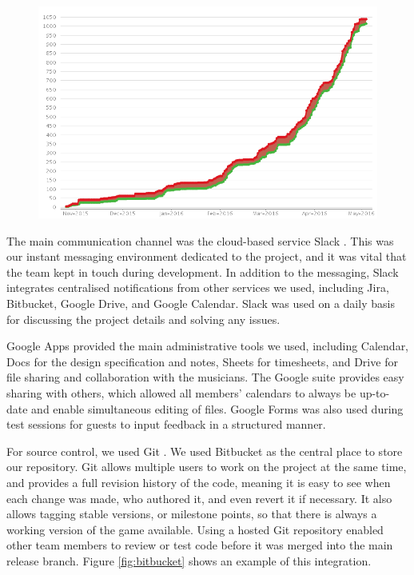 \documentclass[a4paper,11pt]{article}
\begin{document}
\begin{figure}[ht]
	\centering
    \includegraphics[width=.75\textwidth]{jira_open_vs_closed}
    \label{fig:jira_open_closed}
\end{figure}

The main communication channel was the cloud-based service Slack \cite{slack}. This was our instant messaging environment dedicated to the project, and it was vital that the team kept in touch during development. In addition to the messaging, Slack integrates centralised notifications from other services we used, including Jira, Bitbucket, Google Drive, and Google Calendar. Slack was used on a daily basis for discussing the project details and solving any issues.

Google Apps \cite{google_apps} provided the main administrative tools we used, including Calendar, Docs for the design specification and notes, Sheets for timesheets, and Drive for file sharing and collaboration with the 
musicians. The Google suite provides easy sharing with others, which allowed all members’ calendars to always be up-to-date and enable simultaneous editing of files. Google Forms was also used during test sessions for guests to input feedback in a structured manner.

For source control, we used Git \cite{git}. We used Bitbucket \cite{bitbucket} as the central place to store our repository. Git allows multiple users to work on the project at the same time, and provides a full revision history of the code, meaning it is easy to see when each change was made, who authored it, and even revert it if necessary. It also allows tagging stable versions, or milestone points, so that there is always a working version of the game available. Using a hosted Git repository enabled other team members to review or test code before it was merged into the main release branch. Figure \ref{fig:bitbucket} shows an example of this integration.
\end{document}
